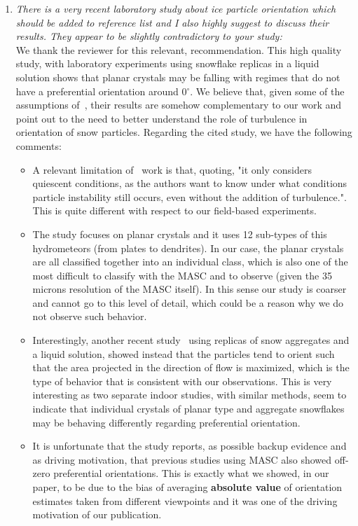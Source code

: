 \documentclass[12pt]{article}
\begin{document}
\begin{enumerate}
    
    \item \textit{There is a very recent laboratory study about ice particle orientation which should be added to reference list and I also highly suggest to discuss their results. They appear to be slightly contradictory to your study:} \cite{Stout_ACP_2024} \\

    We thank the reviewer for this relevant, recommendation.  This high quality study, with laboratory experiments using snowflake replicas in a liquid solution shows that planar crystals may be falling with regimes that do not have a preferential orientation around 0$^\circ$. We believe that, given some of the assumptions of~\cite{Stout_ACP_2024}, their results are somehow complementary to our work and point out to the need to better understand the role of turbulence in orientation of snow particles. Regarding the cited study, we have the following comments:
    \begin{itemize}
        \item A relevant limitation of~\cite{Stout_ACP_2024} work is that, quoting, "it  only considers quiescent conditions, as the authors want to know under what conditions particle instability still occurs, even without the addition of turbulence.". This is quite different with respect to our field-based experiments.
        \item The study focuses on planar crystals and it uses 12 sub-types of this  hydrometeors (from plates to dendrites). In our case, the planar crystals are all classified together into an individual class, which is also one of the most difficult to classify with the MASC and to observe (given the 35 microns resolution of the MASC itself). In this sense our study is coarser and cannot go to this level of detail, which could be a reason why we do not observe such behavior. 
        \item Interestingly, another recent study~\cite{Koebschall_EF_2023} using replicas of snow aggregates and a liquid solution, showed instead that the particles tend to orient such that the area projected in the direction of flow is maximized, which is the type of behavior that is consistent with our observations. This is very interesting as two separate indoor studies, with similar methods, seem to indicate that individual crystals of planar type and aggregate snowflakes may be behaving differently regarding preferential orientation.
        \item It is unfortunate that the study reports, as possible backup evidence and as driving motivation, that previous studies using MASC also showed off-zero preferential orientations. This is exactly what we showed, in our paper, to be due to the bias of averaging \textbf{absolute value} of orientation estimates taken from different viewpoints and it was one of the driving motivation of our publication.  

\end{itemize}
\end{enumerate}
\end{document}
